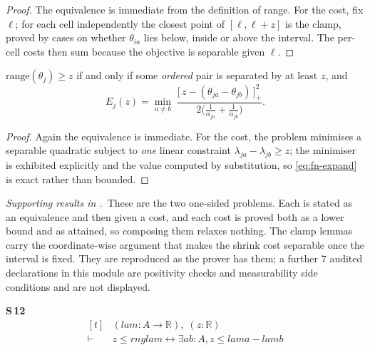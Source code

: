 \begin{proof}
The equivalence is immediate from the definition of range. For the cost, fix $\ell$; for each
cell independently the closest point of $[\ell,\ell+z]$ is the clamp, proved by cases on
whether $\theta_{ia}$ lies below, inside or above the interval. The per-cell costs then sum
because the objective is separable given $\ell$.
\end{proof}


\begin{theorem}[Expand]
\label{thm:fn-expand}
$\mathrm{range}(\theta_{j})\ge z$ if and only if some \emph{ordered} pair is separated by at
least $z$, and
\begin{equation}
E_{j}(z)=\min_{a\neq b}\;
\frac{\bigl[\,z-(\theta_{ja}-\theta_{jb})\,\bigr]_{+}^{2}}
     {2\bigl(\frac{1}{\alpha_{ja}}+\frac{1}{\alpha_{jb}}\bigr)}.
\label{eq:fn-expand}
\end{equation}
\end{theorem}

\begin{proof}
Again the equivalence is immediate. For the cost, the problem minimises a separable quadratic
subject to \emph{one} linear constraint $\lambda_{ja}-\lambda_{jb}\ge z$; the minimiser is
exhibited explicitly and the value computed by substitution, so \eqref{eq:fn-expand} is exact
rather than bounded.
\end{proof}


\noindent\emph{Supporting results in .}~These are the two one-sided problems. Each is stated as an equivalence and then given a cost, and each cost is proved both as a lower bound and as attained, so composing them relaxes nothing. The clamp lemmas carry the coordinate-wise argument that makes the shrink cost separable once the interval is fixed. They are reproduced as the prover has them; a further $7$ audited declarations in this module are positivity checks and measurability side conditions and are not displayed.

\noindent\textbf{S\,12}\quad{}
{\footnotesize\[ \begin{aligned}[t]
&(\mathit{lam} : \mathit{A} \to \mathbb{R} ),\; (\mathit{z} : \mathbb{R} )\\
\vdash\;&\mathit{z} \leq \mathit{rng} \mathit{lam} \leftrightarrow \exists \mathit{a} \mathit{b} : \mathit{A}, \mathit{z} \leq \mathit{lam} \mathit{a} - \mathit{lam} \mathit{b}
\end{aligned} \]}

